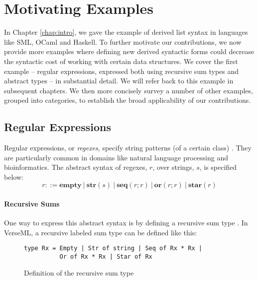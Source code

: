 
\section{Motivating Examples}\label{sec:motivating-examples}
In Chapter \ref{chap:intro}, we gave the example of derived list syntax in languages like SML, OCaml and Haskell. To further motivate our contributions, we now provide more examples where defining new derived syntactic forms could  decrease the syntactic cost of working with certain data structures. We cover the first example -- regular expressions, expressed both using recursive sum types and abstract types -- in substantial detail. We will refer back to this example in subsequent chapters. We then more concisely survey a number of other examples, grouped into  categories, to establish the broad applicability of our contributions. %

\subsection{Regular Expressions}\label{sec:syntax-examples-regexps}
Regular expressions, or \emph{regexes}, specify string patterns (of a certain class) \cite{Thompson:1968:PTR:363347.363387}. They are particularly common in domains like natural language processing and bioinformatics. The abstract syntax of {regexes}, $r$, over strings, $s$, is specified below:\[r ::= \textbf{empty} ~|~ \textbf{str}(s) ~|~ \textbf{seq}(r; r) ~|~ \textbf{or}(r; r) ~|~ \textbf{star}(r)\]

\paragraph{Recursive Sums}
One way to express this abstract syntax is by defining a recursive sum type \cite{pfpl}. In VerseML, a recursive labeled sum type can be defined like this:

\begin{figure}[ht]
\begin{lstlisting}[numbers=none]
type Rx = Empty | Str of string | Seq of Rx * Rx | 
          Or of Rx * Rx | Star of Rx
\end{lstlisting}
\caption{Definition of the recursive sum type }
\label{fig:datatype-rx}
\end{figure}

